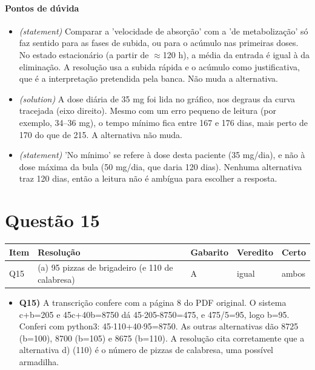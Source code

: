 \documentclass{article}%
\begin{document}
\paragraph{Pontos de dúvida}%
\begin{itemize}%
\item%
\textit{(statement)} Comparar a 'velocidade de absorção' com a 'de metabolização' só faz sentido para as fases de subida, ou para o acúmulo nas primeiras doses. No estado estacionário (a partir de $\approx$120 h), a média da entrada é igual à da eliminação. A resolução usa a subida rápida e o acúmulo como justificativa, que é a interpretação pretendida pela banca. Não muda a alternativa.%
\item%
\textit{(solution)} A dose diária de 35 mg foi lida no gráfico, nos degraus da curva tracejada (eixo direito). Mesmo com um erro pequeno de leitura (por exemplo, 34--36 mg), o tempo mínimo fica entre 167 e 176 dias, mais perto de 170 do que de 215. A alternativa não muda.%
\item%
\textit{(statement)} 'No mínimo' se refere à dose desta paciente (35 mg/dia), e não à dose máxima da bula (50 mg/dia, que daria 120 dias). Nenhuma alternativa traz 120 dias, então a leitura não é ambígua para escolher a resposta.%
\end{itemize}%
\section*{Questão 15}%
\begin{longtable}{@{}p{} p{} p{} p{} p{}@{}}\toprule Item & Resolução & Gabarito & Veredito & Certo \\ \midrule
Q15 & (a) 95 pizzas de brigadeiro (e 110 de calabresa) & A & igual & ambos \\
\bottomrule\end{longtable}%
\begin{itemize}%
\item%
\textbf{Q15)} A transcrição confere com a página 8 do PDF original. O sistema c+b=205 e 45c+40b=8750 dá 45$\cdot$205-8750=475, e 475/5=95, logo b=95. Conferi com python3: 45$\cdot$110+40$\cdot$95=8750. As outras alternativas dão 8725 (b=100), 8700 (b=105) e 8675 (b=110). A resolução cita corretamente que a alternativa d) (110) é o número de pizzas de calabresa, uma possível armadilha.%
\end{itemize}%
\end{document}
